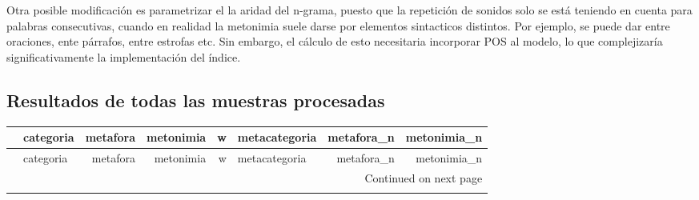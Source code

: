 \documentclass[12pt,letterpaper,twoside]{article}
\begin{document}
Otra posible modificación es parametrizar el la aridad del n-grama, puesto que la repetición de sonidos
solo se está teniendo en cuenta para palabras consecutivas, cuando en realidad la metonimia suele darse
por elementos sintacticos distintos. Por ejemplo, se puede dar entre oraciones, ente párrafos, entre estrofas
etc. Sin embargo, el cálculo de esto necesitaria incorporar POS al modelo, lo que complejizaría significativamente
la implementación del índice. 




 
\nocite{*}
\newpage
\appendix


\begin{landscape}
\tiny
\section{Resultados de todas las muestras procesadas}

\begin{longtable}{llrrrlrr}
\toprule
{} &                      categoria &      metafora &   metonimia &     w & metacategoria &  metafora\_n &  metonimia\_n \\
\midrule
\endfirsthead

\toprule
{} &                      categoria &      metafora &   metonimia &     w & metacategoria &  metafora\_n &  metonimia\_n \\
\midrule
\endhead
\midrule
\multicolumn{8}{r}{{Continued on next page}} \\
\midrule
\endfoot


\end{longtable}
\end{landscape}
\end{document}
